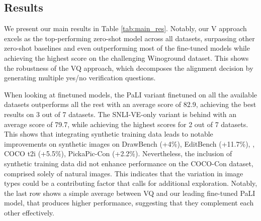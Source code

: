 \documentclass{article}
\newcommand{\VQSQR}[0]{VQ\xspace}
\begin{document}
\subsection{Results}

We present our main results in Table \ref{tab:main_res}. Notably, our V approach excels as the top-performing zero-shot model across all datasets, surpassing other zero-shot baselines and even outperforming most of the fine-tuned models while achieving the highest score on the challenging Winoground dataset. This shows the robustness of the \VQSQR approach, which decomposes the alignment decision by generating multiple yes/no verification questions.

When looking at finetuned models, the PaLI variant finetuned on all the available datasets outperforms all the rest with an average score of 82.9, achieving the best results on 3 out of 7 datasets. The SNLI-VE-only variant is behind with an average score of 79.7, while achieving the highest scores for 2 out of 7 datasets. This shows that integrating synthetic training data leads to notable improvements on synthetic images on DrawBench (+4\%), EditBench (+11.7\%), , COCO t2i (+5.5\%), PickaPic-Con (+2.2\%). Nevertheless, the inclusion of synthetic training data did not enhance performance on the COCO-Con dataset, comprised solely of natural images. This indicates that the variation in image types could be a contributing factor that calls for additional exploration. Notably, the last row shows a simple average between \VQSQR and our leading fine-tuned PaLI model, that produces higher performance, suggesting that they complement each other effectively.
\end{document}
